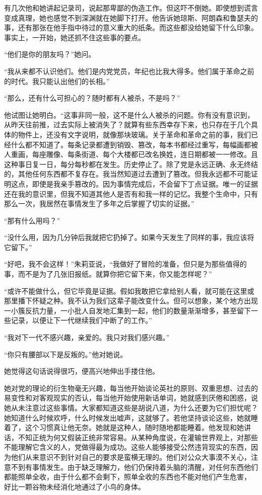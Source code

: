 有几次他和她讲起记录司，说起那卑鄙的伪造工作。但这吓不倒她。即使想到谎言变成真理，她也感觉不到深渊就在她脚下打开。他告诉她琼斯、阿朗森和鲁瑟夫的事，还有那张在他手指中待过的意义重大的纸条。而这些都没给她留下什么印象。事实上，一开始，她还抓不住这些事的要点。

``他们是你的朋友吗？''她问。

``我从来都不认识他们。他们是内党党员，年纪也比我大得多。他们属于革命之前的时代。我只能认出他们的长相。''

``那么，还有什么可担心的？随时都有人被杀，不是吗？''

他试图让她明白。``这事非同一般，这不是什么人被杀的问题。你有没有意识到，从昨天往前推，过去实际上被消失了？就算有些东西幸存下来，也只存在于几个具体的物件上，还没有文字说明，就像那块玻璃。关于革命和革命之前的事，我们已经什么都不知道了。每条记录都遭到销毁、篡改，每本书都经过重写，每幅画都被人重画，每座雕像、每条街道、每个大楼都已改名换姓，连日期都被一一修改。且这种事日复一日，每分每秒都在发生。历史停止了。除了党是永远正确、永无终结的，其他任何东西都不复存在。我当然知道过去遭到了篡改。但我永远都不可能证明这点，即使是我亲手篡改的。因为事情完成后，不会留下丁点证据。唯一的证据还在我的意识里，但我不知道其他人是否有和我一样的记忆。我整个生命中，只有那么一次，我居然在事情发生了多年之后掌握了切实的证据。''

``那有什么用吗？''

``没什么用，因为几分钟后我就把它扔掉了。如果今天发生了同样的事，我应该将它留下。''

``好吧，我不会这样！''朱莉亚说，``我做好了冒险的准备，但只是为那些值得的事，而不是为了几张旧报纸。就算你把它留下来，你又能怎样呢？''

``或许不能做什么，但它毕竟是证据。假如我敢把它拿给别人看，就可能在这里或那里播下怀疑之种。我不认为我们这辈子能改变什么。但可以想象，某个地方出现一小簇反抗力量，一小批人自发地汇集到一起，他们的数量渐渐增多，甚至留下一些记录，以便让下一代继续我们中断了的工作。''

``我对下一代不感兴趣，亲爱的。我只对我们感兴趣。''

``你只有腰部以下是反叛的。''他对她说。

她觉得这句话说得很巧，便高兴地伸出手搂住他。

她对党的理论的衍生物毫无兴趣，每当他开始谈论英社的原则、双重思想、过去的易变性和对客观现实的否认，每当他开始使用新话单词，她就感到厌倦和困惑，说她从未注意过这些事情。大家都知道这些是胡说八道，为什么还要为它们担忧呢？她知道什么时候欢呼，什么时候发出嘘声，这就够了。若他坚持谈论这些，她就睡着了，这个习惯真让他无奈。她就是这种人，随时随地都能睡着。他发现和她讲话，不知正统为何又假装正统非常容易。从某种角度说，在灌输世界观上，对那些不能理解它含义的人，党做得最为成功。这些人能够接受公然违背现实的东西，因为他们从来意识不到针对自己的要求是蛮横无理的。他们对公众大事漠不关心，注意不到有事情发生。由于缺乏理解力，他们仍保持着头脑的清醒，对任何东西他们都能照单全收，由于什么都不会剩下，照单全收的东西也不能对他们产生危害，
好比一颗谷物未经消化地通过了小鸟的身体。

